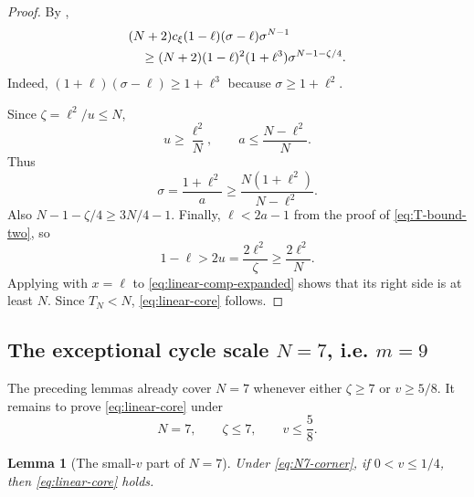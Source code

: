 \documentclass[11pt]{article}
\newtheorem{lemma}[theorem]{Lemma}
\begin{document}
\begin{proof}
By ,
\begin{align}
 &(N+2)c_\xi(1-\ell)(\sigma-\ell)\sigma^{N-1}\notag\\
 &\quad\ge
 (N+2)(1-\ell)^2(1+\ell^3)
 \sigma^{N-1-\zeta/4}.
 \label{eq:linear-comp-expanded}
\end{align}
Indeed, \((1+\ell)(\sigma-\ell)\ge1+\ell^3\) because
\(\sigma\ge1+\ell^2\).

Since \(\zeta=\ell^2/u\le N\),
\[
       u\ge\frac{\ell^2}{N},
       \qquad
       a\le\frac{N-\ell^2}{N}.
\]
Thus
\begin{equation}\label{eq:sigma-lower-J}
       \sigma=\frac{1+\ell^2}{a}
       \ge\frac{N(1+\ell^2)}{N-\ell^2}.
\end{equation}
Also \(N-1-\zeta/4\ge3N/4-1\).  Finally,
\(\ell<2a-1\) from the proof of \eqref{eq:T-bound-two}, so
\[
       1-\ell>2u=\frac{2\ell^2}{\zeta}
       \ge\frac{2\ell^2}{N}.
\]
Applying  with \(x=\ell\) to
\eqref{eq:linear-comp-expanded} shows that its right side is at least
\(N\).  Since \(T_N<N\), \eqref{eq:linear-core} follows.
\end{proof}

\subsection{The exceptional cycle scale \texorpdfstring{\(N=7\), i.e. \(m=9\)}{N=7, i.e. m=9}}

The preceding lemmas already cover \(N=7\) whenever either
\(\zeta\ge7\) or \(v\ge5/8\).  It remains to prove
\eqref{eq:linear-core} under
\begin{equation}\label{eq:N7-corner}
       N=7,
       \qquad \zeta\le7,
       \qquad v\le\frac58.
\end{equation}

\begin{lemma}[The small-\(v\) part of \(N=7\)]\label{lem:N7-small-v}
Under \eqref{eq:N7-corner}, if \(0<v\le1/4\), then
\eqref{eq:linear-core} holds.
\end{lemma}
\end{document}
